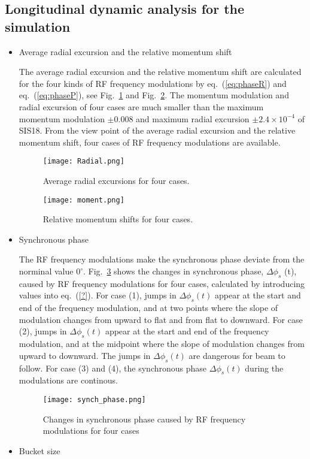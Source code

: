 \subsection{Longitudinal dynamic analysis for the simulation}
\begin{itemize}
\item Average radial excursion and the relative momentum shift

The average radial excursion and the relative momentum shift are calculated for the four kinds of RF frequency modulations by eq.~(\ref{eq:phaseR}) and eq.~(\ref{eq:phaseP}), see Fig.~\ref{radial} and Fig.~\ref{moment}. The momentum modulation and radial excursion of four cases are much smaller than the maximum momentum modulation $\pm 0.008$ and maximum radial excursion $\pm 2.4\times10^{-4}$ of SIS18. From the view point of the average radial excursion and the relative momentum shift, four cases of RF frequency modulations are available.
\begin{figure}[!htb]
   \centering   
   \texttt{[image: Radial.png]}
   \caption{Average radial excursions for four cases.}
   \label{radial}
\end{figure}
\begin{figure}[!htb]
   \centering   
   \texttt{[image: moment.png]}
   \caption{Relative momentum shifts for four cases.}
   \label{moment}
\end{figure}
\item Synchronous phase

The RF frequency modulations make the synchronous phase deviate from the norminal value $0^\circ$. Fig.~\ref{synch_phase} shows the changes in synchronous phase, $\Delta \phi_s$ (t), caused by RF frequency modulations for four cases, calculated by introducing values into eq.~(\ref{?}). For case (1), jumps in $\Delta \phi_s(t)$ appear at the start and end of the frequency modulation, and at two points where the slope of modulation changes from upward to flat and from flat to downward. For case (2), jumps in $\Delta \phi_s(t)$ appear at the start and end of the frequency modulation, and at the midpoint where the slope of modulation changes from upward to downward. The jumps in $\Delta \phi_s(t)$ are dangerous for beam to follow. For case (3) and (4), the  synchronous phase $\Delta \phi_s(t)$ during the modulations are continous.
\begin{figure}[!htb]
   \centering   
   \texttt{[image: synch\_phase.png]}
   \caption{Changes in synchronous phase caused by RF frequency modulations for four cases}
   \label{synch_phase}
\end{figure}
\item Bucket size


\end{itemize}
